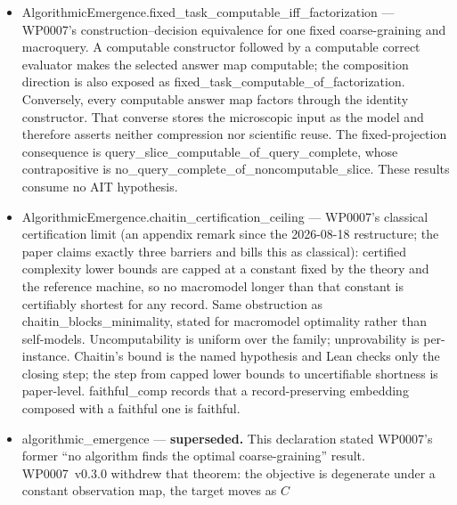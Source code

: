 \documentclass[11pt,a4paper]{article}
\newcommand{\lean}[1]{{\ttfamily\small
  \let\leanunderscore\_\def\_{\leanunderscore\allowbreak}#1}}
\begin{document}
\begin{itemize}[leftmargin=1.4em,itemsep=1pt]
\lean{IsFunctionalCore}, and \lean{approximateCoreComplexity} minimize description length
for the declared behavior, exactly or within a fixed discrepancy tolerance. The exact benchmark
preserves the model's task outputs, including imperfect predictions, and asserts no optimization
of task loss or runtime. Interpreter computability, core extraction, and a new transfer of
the discovery barriers are outside these results. The accompanying no-hypercompression
inequality remains a classical probability result proved at paper level in WP0007.
\item \lean{AlgorithmicEmergence.fixed\_task\_computable\_iff\_factorization} --- WP0007's
construction--decision equivalence for one fixed coarse-graining and macroquery. A computable
constructor followed by a computable correct evaluator makes the selected answer map computable;
the composition direction is also exposed as
\lean{fixed\_task\_computable\_of\_factorization}. Conversely, every computable answer map factors
through the identity constructor. That converse stores the microscopic input as the model and
therefore asserts neither compression nor scientific reuse. The fixed-projection consequence is
\lean{query\_slice\_computable\_of\_query\_complete}, whose contrapositive is
\lean{no\_query\_complete\_of\_noncomputable\_slice}. These results consume no AIT hypothesis.
\item \lean{AlgorithmicEmergence.chaitin\_certification\_ceiling} --- WP0007's classical
certification limit (an appendix remark since the 2026-08-18 restructure; the paper claims
exactly three barriers and bills this as classical): certified complexity lower bounds are
capped at a constant fixed by the theory and the reference machine, so no macromodel longer
than that constant is certifiably shortest for any record. Same obstruction as
\lean{chaitin\_blocks\_minimality}, stated for macromodel optimality rather than self-models.
Uncomputability is uniform over the family; unprovability is per-instance. Chaitin's bound is
the named hypothesis and Lean checks only the closing step; the step from capped lower bounds to
uncertifiable shortness is paper-level. \lean{faithful\_comp} records that a record-preserving
embedding composed with a faithful one is faithful.
\item \lean{algorithmic\_emergence} --- \textbf{superseded.} This declaration stated WP0007's
former ``no algorithm finds the optimal coarse-graining'' result. WP0007~v0.3.0 withdrew that
theorem: the objective is degenerate under a constant observation map, the target moves as $C$

\end{itemize}
\end{document}
